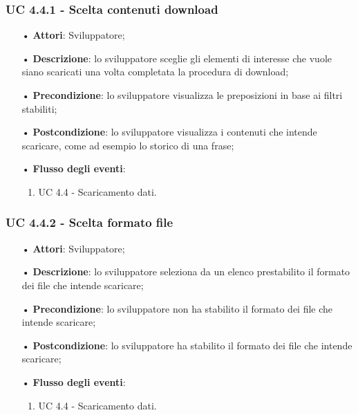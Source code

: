 \subsubsection{UC 4.4.1 - Scelta contenuti download}
\begin{itemize}
\item[•]\textbf{Attori}: Sviluppatore;
\item[•]\textbf{Descrizione}: lo sviluppatore sceglie gli elementi di interesse che vuole siano scaricati una volta completata la procedura di download;
\item[•]\textbf{Precondizione}: lo sviluppatore visualizza le preposizioni in base ai filtri stabiliti;
\item[•]\textbf{Postcondizione}: lo sviluppatore visualizza i contenuti che intende scaricare, come ad esempio lo storico di una frase;
\item[•]\textbf{Flusso degli eventi}: 
	\begin{enumerate}
	\item UC 4.4 - Scaricamento dati.
\end{enumerate}
\end{itemize}

\subsubsection{UC 4.4.2 - Scelta formato file}
\begin{itemize}
\item[•]\textbf{Attori}: Sviluppatore;
\item[•]\textbf{Descrizione}:  lo sviluppatore seleziona da un elenco prestabilito il formato dei file che intende scaricare;
\item[•]\textbf{Precondizione}: lo sviluppatore non ha stabilito il formato dei file che intende scaricare;
\item[•]\textbf{Postcondizione}: lo sviluppatore ha stabilito il formato dei file che intende scaricare;
\item[•]\textbf{Flusso degli eventi}:
	\begin{enumerate}
	\item UC 4.4 - Scaricamento dati.
\end{enumerate}
\end{itemize}

